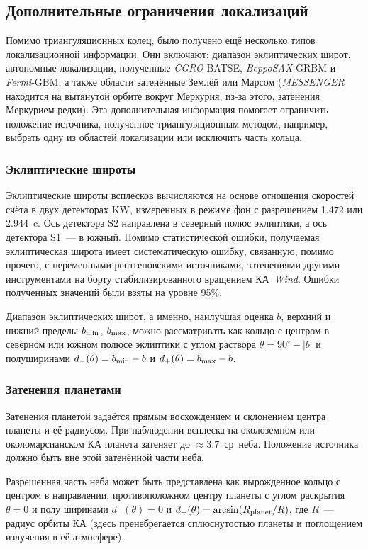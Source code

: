 \FloatBarrier
\subsection{Дополнительные ограничения локализаций}
Помимо триангуляционных колец, было получено ещё несколько типов локализационной информации. 
Они включают: диапазон эклиптических широт, автономные локализации, полученные 
\textit{CGRO}-BATSE, \textit{BeppoSAX}-GRBM и \textit{Fermi}-GBM, а также области 
затенённые Землёй или Марсом (\textit{MESSENGER} находится на вытянутой орбите вокруг Меркурия, из-за этого, 
затенения Меркурием редки). Эта дополнительная информация помогает ограничить 
положение источника, полученное триангуляционным методом, например, 
выбрать одну из областей локализации или исключить часть кольца.

\subsubsection{Эклиптические широты}
Эклиптические широты всплесков вычисляются на основе отношения скоростей счёта
в двух детекторах KW, измеренных в режиме фон с разрешением 1.472 или 2.944~c. Ось
детектора S2 направлена в северный полюс эклиптики, а ось детектора S1~--- в южный.
Помимо статистической ошибки, получаемая эклиптическая широта имеет систематическую 
ошибку, связанную, помимо прочего, с переменными рентгеновскими источниками,
затенениями другими инструментами на борту стабилизированного вращением КА~\textit{Wind}.
Ошибки полученных значений были взяты на уровне 95\%.

Диапазон эклиптических широт, а именно, наилучшая оценка $b$, верхний и нижний
пределы $b_{{\mathrm{min}}}$, $b_{{\mathrm{max}}}$, можно рассматривать как кольцо с центром в северном или южном
полюсе эклиптики с углом раствора $\theta = 90^\circ - |b|$ и полуширинами 
$d_{-}(\theta) = b_{{\mathrm{min}}} - b$ и $d_{+}(\theta) = b_{{\mathrm{max}}} - b$.

\subsubsection{Затенения планетами}
Затенения планетой задаётся прямым восхождением и склонением центра планеты и её
радиусом. При наблюдении всплеска на околоземном или околомарсианском КА планета
затеняет до $\approx 3.7$~ср~неба. Положение источника должно быть вне этой 
затенённой части неба.

Разрешенная часть неба может быть представлена как вырожденное кольцо с центром
в направлении, противоположном центру планеты с углом раскрытия $\theta =0$ и 
полу ширинами $d_{-}(\theta) = 0$ и $d_{+}(\theta)= \arcsin(R_{{\mathrm{planet}}}/R)$, 
где $R$~--- радиус орбиты КА (здесь пренебрегается сплюснутостью планеты 
и поглощением излучения в её атмосфере).

